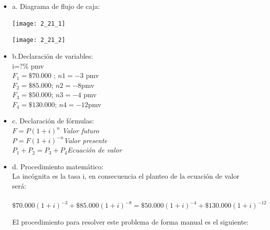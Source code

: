 \begin{itemize}
	\item a. Diagrama de flujo de caja:\\
	
	\begin{center}
		\texttt{[image: 2\_21\_1]}\\
	\end{center}
	
	\begin{center}
		\texttt{[image: 2\_21\_2]}\\
	\end{center}
	
	\item b.Declaración de variables:\\
	
	i=?\% pmv\\
	$F_{1} = \$70.000$ ; \hspace{25}$n1 = -3$ pmv\\
    $F_{2} = \$ 85.000$; \hspace{25}$n2 = -8$pmv \\
    $F_{3} = \$ 50.000$; \hspace{25}$n3 = -4$ pmv\\
    $F_{4} = \$130.000$; \hspace{22}$n4= -12$pmv \\
	
	\item c. Declaración de fórmulas:\\
	
	$F = P(1 + i)^n$ \hspace{35}\textit{Valor futuro}\\
	$P = F(1 + i)^{-n}$\hspace{35}\textit{Valor presente}\\
	$P_{1} + P_{2} = P_{3} + P_{4}$\hspace{35}\textit{Ecuación de valor}\\
	
	\item d. Procedimiento matemático:\\
	
	La incógnita es la tasa i, en consecuencia el planteo de la ecuación de valor será:\\ \\
	$\$70.000(1+i)^{-3}+\$85.000(1+i)^{-8} = \$50.000(1+i)^{-4} + \$130.000(1+i)^{-12}$
	
	El procedimiento para resolver este problema de forma manual es el siguiente:\\
	

\end{itemize}
